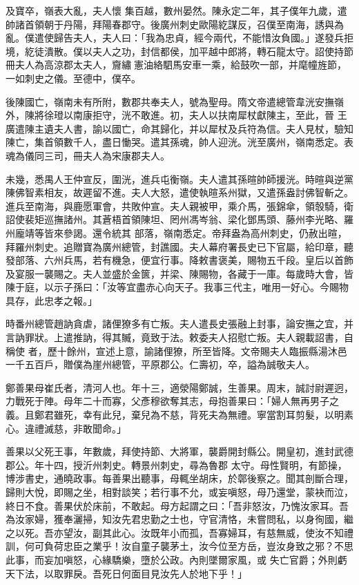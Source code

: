 \begin{pinyinscope}
 及寶卒，嶺表大亂，夫人懷
 集百越，數州晏然。陳永定二年，其子僕年九歲，遣帥諸首領朝于丹陽，拜陽春郡守。後廣州刺史歐陽紇謀反，召僕至南海，誘與為亂。僕遣使歸告夫人，夫人曰：「我為忠貞，經今兩代，不能惜汝負國。」遂發兵拒境，紇徒潰散。僕以夫人之功，封信都侯，加平越中郎將，轉石龍太守。詔使持節冊夫人為高涼郡太夫人，齎繡憲油絡駟馬安車一乘，給鼓吹一部，并麾幢旌節，一如刺史之儀。至德中，僕卒。



 後陳國亡，嶺南未有所附，數郡共奉夫人，號為聖母。隋文帝遣總管韋洸安撫嶺外，陳將徐璒以南康拒守，洸不敢進。初，夫人以扶南犀杖獻陳主，至此，晉
 王廣遣陳主遺夫人書，諭以國亡，命其歸化，并以犀杖及兵符為信。夫人見杖，驗知陳亡，集首領數千人，盡日慟哭。遣其孫魂，帥人迎洸。洸至廣州，嶺南悉定。表魂為儀同三司，冊夫人為宋康郡夫人。



 未幾，悉禺人王仲宣反，圍洸，進兵屯衡嶺。夫人遣其孫暄帥師援洸。時暄與逆黨陳佛智素相友，故遲留不進。夫人大怒，遣使執暄系州獄，又遣孫盎討佛智斬之。進兵至南海，與鹿愿軍會，共敗仲宣。夫人親被甲，乘介馬，張錦傘，領彀騎，衛詔使裴矩巡撫諸州。其蒼梧首領陳坦、罔州馮岑翁、梁化鄧馬頭、藤州李光略、羅州龐靖等皆來參謁。還令統其
 部落，嶺南悉定。帝拜盎為高州刺史，仍赦出暄，拜羅州刺史。追贈寶為廣州總管，封譙國。夫人幕府署長史已下官屬，給印章，聽發部落、六州兵馬，若有機急，便宜行事。降敕書褒美，賜物五千段。皇后以首飾及宴服一襲賜之。夫人並盛於金篋，并梁、陳賜物，各藏于一庫。每歲時大會，皆陳于庭，以示子孫曰：「汝等宜盡赤心向天子。我事三代主，唯用一好心。今賜物具存，此忠孝之報。」



 時番州總管趙訥貪虐，諸俚獠多有亡叛。夫人遣長史張融上封事，論安撫之宜，并言訥罪狀。上遣推訥，得其贓，竟致于法。敕委夫人招慰亡叛。夫人親載詔書，自稱使
 者，歷十餘州，宣述上意，諭諸俚獠，所至皆降。文帝賜夫人臨振縣湯沐邑一千五百戶，贈僕為崖州總管，平原郡公。仁壽初，卒，謚為誠敬夫人。



 鄭善果母崔氏者，清河人也。年十三，適滎陽鄭誠，生善果。周末，誠討尉遲迥，力戰死于陣。母年二十而寡，父彥穆欲奪其志，母抱善果曰：「婦人無再男子之義。且鄭君雖死，幸有此兒，棄兒為不慈，背死夫為無禮。寧當割耳剪髮，以明素心。違禮滅慈，非敢聞命。」



 善果以父死王事，年數歲，拜使持節、大將軍，襲爵開封縣公。開皇初，進封武德郡公。年十四，授沂州刺史。轉景州刺史，尋為魯郡
 太守。母性賢明，有節操，博涉書史，通曉政事。每善果出聽事，母輒坐胡床，於鄣後察之。聞其剖斷合理，歸則大悅，即賜之坐，相對談笑；若行事不允，或妄嗔怒，母乃還堂，蒙袂而泣，終日不食。善果伏於床前，不敢起。母方起謂之曰：「吾非怒汝，乃愧汝家耳。吾為汝家婦，獲奉灑掃，知汝先君忠勤之士也，守官清恪，未嘗問私，以身徇國，繼之以死。吾亦望汝，副其此心。汝既年小而孤，吾寡婦耳，有慈無威，使汝不知禮訓，何可負荷忠臣之業乎！汝自童子襲茅土，汝今位至方岳，豈汝身致之邪？不思此事，而妄加嗔怒，心緣驕樂，墮於公政。內則墜爾家風，或
 失亡官爵；外則虧天下法，以取罪戾。吾死日何面目見汝先人於地下乎！」




\end{pinyinscope}
